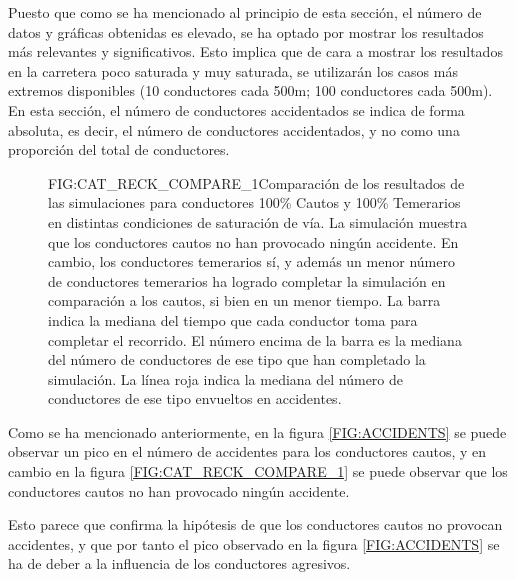 Puesto que como se ha mencionado al principio de esta sección, el número de datos y gráficas obtenidas
es elevado, se ha optado por mostrar los resultados más relevantes y significativos. Esto implica
que de cara a mostrar los resultados en la carretera poco saturada y muy saturada, se utilizarán los casos más extremos
disponibles (10 conductores cada 500m; 100 conductores cada 500m). En esta sección, el número de conductores accidentados
se indica de forma absoluta, es decir, el número de conductores accidentados, y no como una proporción del total de conductores.

\begin{figure}[Resultados para conductores Cautos y Temerarios, separados]{FIG:CAT_RECK_COMPARE_1}{Comparación de los resultados de las simulaciones para conductores 100\% Cautos y 100\% Temerarios en distintas condiciones de saturación de vía. La simulación muestra que los conductores cautos no han provocado ningún accidente. En cambio, los conductores temerarios sí, y además un menor número de conductores temerarios ha logrado completar la simulación en comparación a los cautos, si bien en un menor tiempo.
    La barra indica la mediana del tiempo que cada conductor toma para completar el recorrido. El número encima de la barra es la mediana del número de conductores de ese tipo
    que han completado la simulación. La línea roja indica la mediana del número de conductores de ese tipo envueltos en accidentes.}
     \hspace{1cm}
     \vspace{1cm}
    
     \hspace{1cm}
\end{figure}

Como se ha mencionado anteriormente, en la figura \ref{FIG:ACCIDENTS} se puede observar un pico en el número de accidentes para
los conductores cautos, y en cambio en la figura \ref{FIG:CAT_RECK_COMPARE_1} se puede observar que los conductores cautos no han provocado ningún accidente.

Esto parece que confirma la hipótesis de que los conductores cautos no provocan accidentes, y que por tanto el pico observado en la figura \ref{FIG:ACCIDENTS}
se ha de deber a la influencia de los conductores agresivos. 

